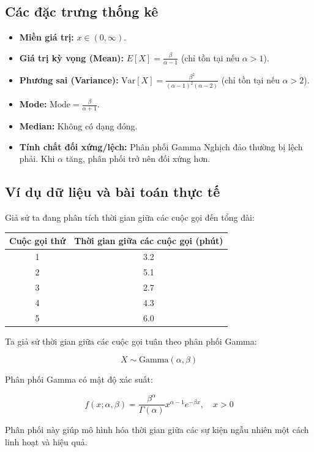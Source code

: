 	\subsection{Các đặc trưng thống kê}
	\begin{itemize}
		\item \textbf{Miền giá trị:} $x \in (0, \infty)$.
		\item \textbf{Giá trị kỳ vọng (Mean):} $E[X] = \frac{\beta}{\alpha-1}$ \quad (chỉ tồn tại nếu $\alpha > 1$).
		\item \textbf{Phương sai (Variance):} $\text{Var}[X] = \frac{\beta^2}{(\alpha-1)^2(\alpha-2)}$ \quad (chỉ tồn tại nếu $\alpha > 2$).
		\item \textbf{Mode:} $\text{Mode} = \frac{\beta}{\alpha+1}$.
		\item \textbf{Median:} Không có dạng đóng.
		\item \textbf{Tính chất đối xứng/lệch:} Phân phối Gamma Nghịch đảo thường bị lệch phải. Khi $\alpha$ tăng, phân phối trở nên đối xứng hơn.
	\end{itemize}

	\subsection{Ví dụ dữ liệu và bài toán thực tế}

	Giả sử ta đang phân tích thời gian giữa các cuộc gọi đến tổng đài:

	\begin{center}
	\begin{tabular}{|c|c|}
	\hline
	Cuộc gọi thứ & Thời gian giữa các cuộc gọi (phút) \\
	\hline
	1 & 3.2 \\
	2 & 5.1 \\
	3 & 2.7 \\
	4 & 4.3 \\
	5 & 6.0 \\
	\hline
	\end{tabular}
	\end{center}

	Ta giả sử thời gian giữa các cuộc gọi tuân theo phân phối Gamma:

	\[
	X \sim \text{Gamma}(\alpha, \beta)
	\]

	Phân phối Gamma có mật độ xác suất:

	\[
	f(x; \alpha, \beta) = \frac{\beta^\alpha}{\Gamma(\alpha)} x^{\alpha - 1} e^{-\beta x}, \quad x > 0
	\]

	Phân phối này giúp mô hình hóa thời gian giữa các sự kiện ngẫu nhiên một cách linh hoạt và hiệu quả.

